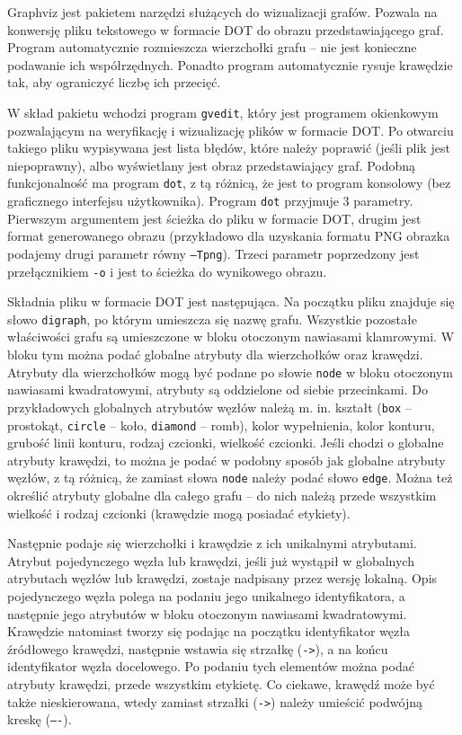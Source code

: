 Graphviz \cite{Graphviz} jest pakietem narzędzi służących do wizualizacji grafów. Pozwala na konwersję pliku tekstowego w formacie DOT do obrazu przedstawiającego graf. Program automatycznie rozmieszcza wierzchołki grafu -- nie jest konieczne podawanie ich współrzędnych. Ponadto program automatycznie rysuje krawędzie tak, aby ograniczyć liczbę ich przecięć. 

W skład pakietu wchodzi program \texttt{gvedit}, który jest programem okienkowym pozwalającym na weryfikację i wizualizację plików w formacie DOT. Po otwarciu takiego pliku wypisywana jest lista błędów, które należy poprawić (jeśli plik jest niepoprawny), albo wyświetlany jest obraz przedstawiający graf. Podobną funkcjonalność ma program \texttt{dot}, z tą różnicą, że jest to program konsolowy (bez graficznego interfejsu użytkownika). Program \texttt{dot} przyjmuje 3 parametry. Pierwszym argumentem jest ścieżka do pliku w formacie DOT, drugim jest format generowanego obrazu (przykładowo dla uzyskania formatu PNG obrazka podajemy drugi parametr równy \texttt{–Tpng}). Trzeci parametr poprzedzony jest przełącznikiem \texttt{-o} i jest to ścieżka do wynikowego obrazu. 

Składnia pliku w formacie DOT jest następująca. Na początku pliku znajduje się słowo \texttt{digraph}, po którym umieszcza się nazwę grafu. Wszystkie pozostałe właściwości grafu są umieszczone w bloku otoczonym nawiasami klamrowymi. W bloku tym można podać globalne atrybuty dla wierzchołków oraz krawędzi. Atrybuty dla wierzchołków mogą być podane po słowie \texttt{node} w bloku otoczonym nawiasami kwadratowymi, atrybuty są oddzielone od siebie przecinkami. Do przykładowych globalnych atrybutów węzłów należą m. in. kształt (\texttt{box} – prostokąt, \texttt{circle} – koło, \texttt{diamond} – romb), kolor wypełnienia, kolor konturu, grubość linii konturu, rodzaj czcionki, wielkość czcionki. Jeśli chodzi o globalne atrybuty krawędzi, to można je podać w podobny sposób jak globalne atrybuty węzłów, z tą różnicą, że zamiast słowa \texttt{node} należy podać słowo \texttt{edge}. Można też określić atrybuty globalne dla całego grafu -- do nich należą przede wszystkim wielkość i rodzaj czcionki (krawędzie mogą posiadać etykiety). 

Następnie podaje się wierzchołki i krawędzie z ich unikalnymi atrybutami. Atrybut pojedynczego węzła lub krawędzi, jeśli już wystąpił w globalnych atrybutach węzłów lub krawędzi, zostaje nadpisany przez wersję lokalną. Opis pojedynczego węzła polega na podaniu jego unikalnego identyfikatora, a następnie jego atrybutów w bloku otoczonym nawiasami kwadratowymi.  Krawędzie natomiast tworzy się podając na początku identyfikator węzła źródłowego krawędzi, następnie wstawia się strzałkę (\texttt{->}), a na końcu identyfikator węzła docelowego. Po podaniu tych elementów można podać atrybuty krawędzi, przede wszystkim etykietę. Co ciekawe, krawędź może być także nieskierowana, wtedy zamiast strzałki (\texttt{->}) należy umieścić podwójną kreskę (\texttt{----}). 

